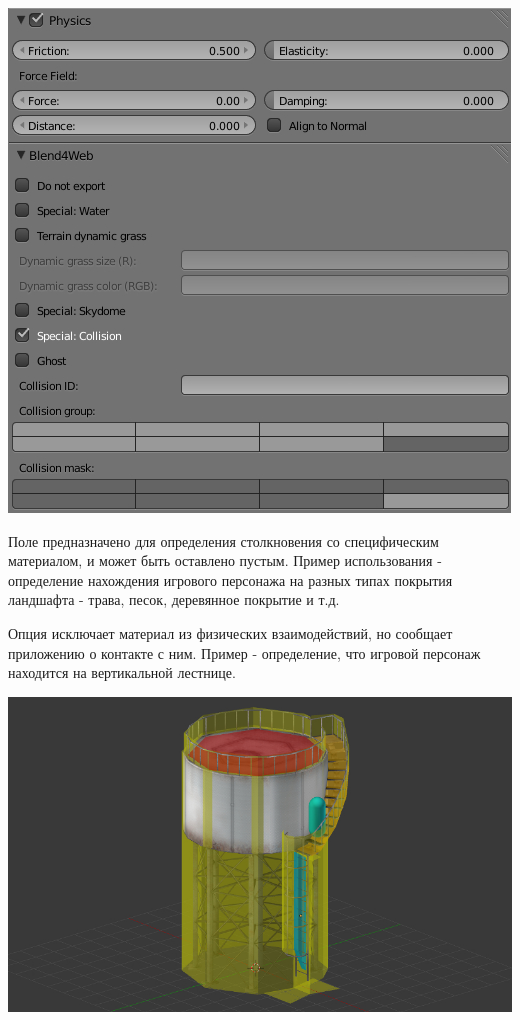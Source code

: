 \documentclass[a4paper,12pt,oneside]{sphinxmanual}
\begin{document}
\includegraphics[width=1.000\linewidth]{material_panel_physics.jpg}

\begin{DUlineblock}{0em}
\item[] 
\end{DUlineblock}

Поле  предназначено для определения столкновения со специфическим материалом, и может быть оставлено пустым. Пример использования  - определение нахождения игрового персонажа на разных типах покрытия ландшафта - трава, песок, деревянное покрытие и т.д.

Опция  исключает материал из физических взаимодействий, но сообщает приложению о контакте с ним. Пример - определение, что игровой персонаж находится на вертикальной лестнице.

\includegraphics[width=1.000\linewidth]{physics_water_tower.jpg}
\end{document}
